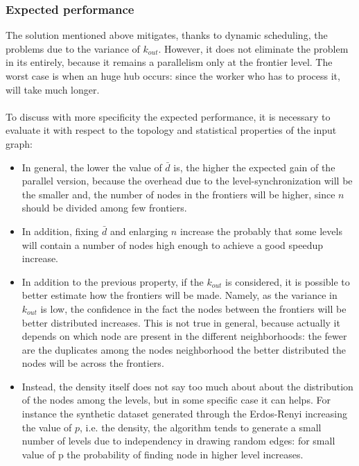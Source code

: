 \subsubsection{Expected performance}
\label{sec:how-it-perform}
The solution mentioned above mitigates, thanks to dynamic scheduling,
the problems due to the variance of $k_{out}$.
However, it does not eliminate the
problem in its entirely, because it remains 
a parallelism only at the frontier level.
The worst case is when an huge hub occurs: 
since the worker who has to process it,
will take much longer.
\\
\\
To discuss with more specificity the expected performance, it is necessary to evaluate it with respect to the topology and statistical properties of the input graph:
\begin{itemize}
    \item In general, the lower the value of $\bar{d}$ is, the higher the expected gain of the parallel version, because the overhead due to the level-synchronization will be the smaller and, the number of nodes in the frontiers will be higher, since $n$ should be divided among few frontiers.
    \item In addition, fixing $\bar{d}$ and enlarging $n$ increase the probably that some levels will contain a number of nodes high enough to achieve a good speedup increase.
    \item In addition to the previous property, if the $k_{out}$ is considered, it is possible to better estimate how the frontiers will be made. Namely, as the variance in $k_{out}$ is low, the confidence in the fact the nodes between the frontiers will be better distributed increases. This is not true in general, because actually it depends on which node are present in the different neighborhoods: the fewer are the duplicates among the nodes neighborhood the better distributed the nodes will be across the frontiers.
    \item Instead, the density itself does not say too much about about the distribution of the nodes among the levels, but in some specific case it can helps. For instance the synthetic dataset generated through the Erdos-Renyi increasing the value of $p$, i.e. the density, the algorithm tends to generate a small number of levels due to independency in drawing random edges: for small value of p the probability of finding node in higher level increases.

\end{itemize}

